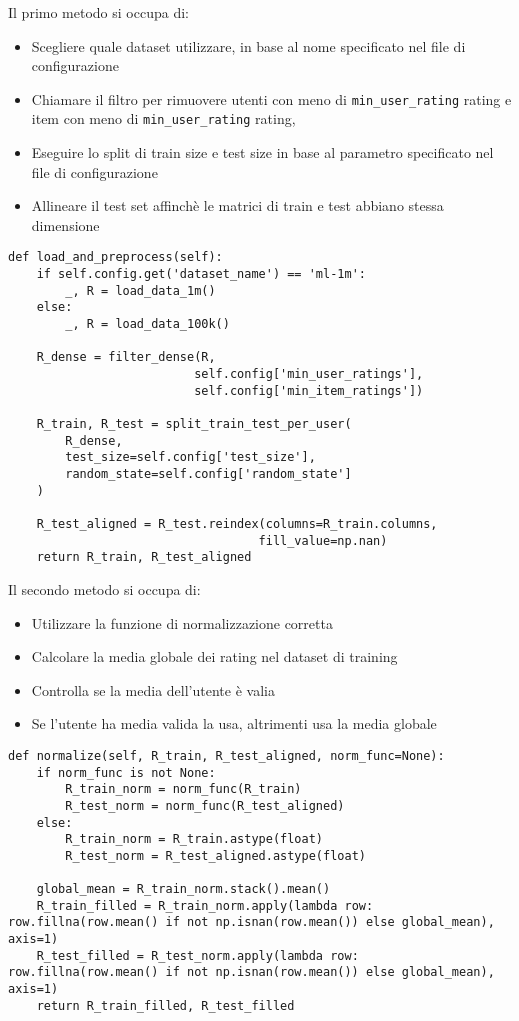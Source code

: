 Il primo metodo si occupa di:
\begin{itemize}
    \item Scegliere quale dataset utilizzare, in base al nome specificato nel file di configurazione
    \item Chiamare il filtro per rimuovere utenti con meno di \texttt{min\_user\_rating} rating e item con meno di \texttt{min\_user\_rating} rating, 
    \item Eseguire lo split di train size e test size in base al parametro specificato nel file di configurazione
    \item Allineare il test set affinchè le matrici di train e test abbiano stessa dimensione
\end{itemize}

\begin{lstlisting}[style=PythonStyle, caption=Metodo load\_and\_preprocess del DataManager]
def load_and_preprocess(self):
    if self.config.get('dataset_name') == 'ml-1m':
        _, R = load_data_1m()
    else:
        _, R = load_data_100k()
    
    R_dense = filter_dense(R, 
                          self.config['min_user_ratings'], 
                          self.config['min_item_ratings'])
    
    R_train, R_test = split_train_test_per_user(
        R_dense, 
        test_size=self.config['test_size'], 
        random_state=self.config['random_state']
    )
    
    R_test_aligned = R_test.reindex(columns=R_train.columns, 
                                   fill_value=np.nan)
    return R_train, R_test_aligned
\end{lstlisting}

Il secondo metodo si occupa di:
\begin{itemize}
    \item Utilizzare la funzione di normalizzazione corretta
    \item Calcolare la media globale dei rating nel dataset di training
    \item Controlla se la media dell'utente è valia
    \item Se l'utente ha media valida la usa, altrimenti usa la media globale
\end{itemize}

\begin{lstlisting}[style=PythonStyle, caption=Metodo normaliza del DataManager]
def normalize(self, R_train, R_test_aligned, norm_func=None):
    if norm_func is not None:
        R_train_norm = norm_func(R_train)
        R_test_norm = norm_func(R_test_aligned)
    else:
        R_train_norm = R_train.astype(float)
        R_test_norm = R_test_aligned.astype(float)
    
    global_mean = R_train_norm.stack().mean()
    R_train_filled = R_train_norm.apply(lambda row: row.fillna(row.mean() if not np.isnan(row.mean()) else global_mean), axis=1)
    R_test_filled = R_test_norm.apply(lambda row: row.fillna(row.mean() if not np.isnan(row.mean()) else global_mean), axis=1)
    return R_train_filled, R_test_filled
\end{lstlisting}

